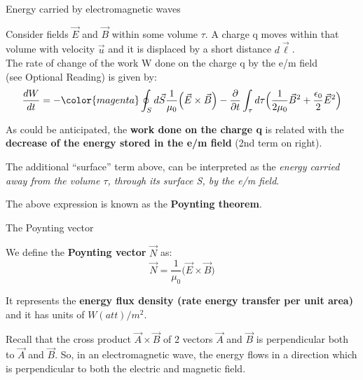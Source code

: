 %
%
%
%

\begin{frame}{Energy carried by electromagnetic waves}

Consider fields $\vec{E}$ and $\vec{B}$ within some volume $\tau$.
A charge q moves within that volume with velocity $\vec{u}$ and it is displaced by a short distance $d\vec{\ell}$.\\
\vspace{0.2cm}
The rate of change of the work W done on the charge q by the
e/m field\\ (see Optional Reading) is given by:
\begin{equation*}
  \frac{dW}{dt} =
     - {\color{magenta} \oint_{S} d\vec{S} \frac{1}{\mu_0} \Big(\vec{E} \times \vec{B} \Big) }
     - \frac{\partial}{\partial t} \int_{\tau} d\tau  \Big( \frac{1}{2\mu_0} \vec{B}^2 + \frac{\epsilon_0}{2} \vec{E}^2 \Big)
\end{equation*}

As could be anticipated, the {\bf work done on the charge q} is related with the
{\bf decrease of the energy stored in the e/m field} (2nd term on right).\\
\vspace{0.2cm}

The additional {\color{magenta}``surface'' term} above,
can be interpreted as the {\em energy carried away
from the volume $\tau$, through its surface S, by the e/m field}.\\
\vspace{0.2cm}

The above expression is known as the {\bf Poynting theorem}.


\end{frame}


%
%
%
%

\begin{frame}{The Poynting vector}

We define the {\bf Poynting vector} $\vec{N}$ as:
\begin{equation*}
  \vec{N} = \frac{1}{\mu_0} \Big( \vec{E} \times \vec{B} \Big)
\end{equation*}

\vspace{0.3cm}

It represents the {\bf energy flux density (rate energy transfer per unit area)} and it has units of $W(att)/m^2$.\\

\vspace{0.3cm}

Recall that the cross product $\vec{A} \times \vec{B}$ of 2 vectors $\vec{A}$ and $\vec{B}$
is perpendicular both to $\vec{A}$ and $\vec{B}$. So, in an electromagnetic wave, the energy
flows in a direction which is perpendicular to both the electric and magnetic field.

\end{frame}

